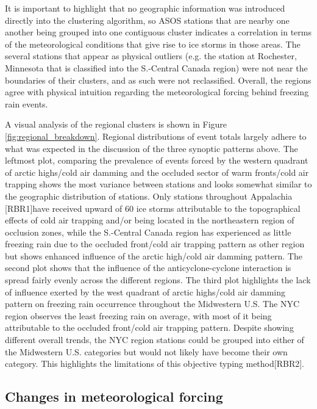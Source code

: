 \documentclass[twocol]{ametsoc}
\begin{document}
It is important to highlight that no geographic information was introduced directly into the clustering algorithm, so ASOS stations that are nearby one another being grouped into one contiguous cluster indicates a correlation in terms of the meteorological conditions that give rise to ice storms in those areas. The several stations that appear as physical outliers (e.g. the station at Rochester, Minnesota that is classified into the S.-Central Canada region) were not near the boundaries of their clusters, and as such were not reclassified. Overall, the regions agree with physical intuition regarding the meteorological forcing behind freezing rain events. 



A visual analysis of the regional clusters is shown in Figure \ref{fig:regional_breakdown}. Regional distributions of event totals largely adhere to what was expected in the discussion of the three synoptic patterns above. The leftmost plot, comparing the prevalence of events forced by the western quadrant of arctic highs/cold air damming and the occluded sector of warm fronts/cold air trapping shows the most variance between stations and looks somewhat similar to the geographic distribution of stations. Only stations throughout Appalachia [RBR1]have received upward of 60 ice storms attributable to the topographical effects of cold air trapping and/or being located in the northeastern region of occlusion zones, while the S.-Central Canada region has experienced as little freezing rain due to the occluded front/cold air trapping pattern as other region but shows enhanced influence of the arctic high/cold air damming pattern. The second plot shows that the influence of the anticyclone-cyclone interaction is spread fairly evenly across the different regions. The third plot highlights the lack of influence exerted by the west quadrant of arctic highs/cold air damming pattern on freezing rain occurrence throughout the Midwestern U.S. The NYC region observes the least freezing rain on average, with most of it being attributable to the occluded front/cold air trapping pattern. Despite showing different overall trends, the NYC region stations could be grouped into either of the Midwestern U.S. categories but would not likely have become their own category. This highlights the limitations of this objective typing method[RBR2].



 

\subsection{Changes in meteorological forcing}
\end{document}
